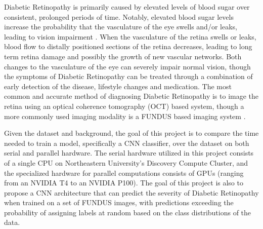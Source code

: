 Diabetic Retinopathy is primarily caused by elevated levels of blood sugar over consistent, prolonged periods of time. Notably, elevated blood sugar levels increase the probability that the vasculature of the eye swells and/or leaks, leading to vision impairment \cite{noauthor_diabetic_nodate-1}. When the vasculature of the retina swells or leaks, blood flow to distally positioned sections of the retina decreases, leading to long term retina damage and possibly the growth of new vascular networks. Both changes to the vasculature of the eye can severely impair normal vision, though the symptoms of Diabetic Retinopathy can be treated through a combination of early detection of the disease, lifestyle changes and medication. The most common and accurate method of diagnosing Diabetic Retinopathy is to image the retina using an optical coherence tomography (OCT) based system, though a more commonly used imaging modality is a FUNDUS based imaging system \cite{noauthor_diabetic_nodate-1}.

Given the dataset and background, the goal of this project is to compare the time needed to train a model, specifically a CNN classifier, over the dataset on both serial and parallel hardware. The serial hardware utilized in this project consists of a single CPU on Northeastern University's Discovery Compute Cluster, and the specialized hardware for parallel computations consists of GPUs (ranging from an NVIDIA T4 to an NVIDIA P100). The goal of this project is also to propose a CNN architecture that can predict the severity of Diabetic Retinopathy when trained on a set of FUNDUS images, with predictions exceeding the probability of assigning labels at random based on the class distributions of the data.
